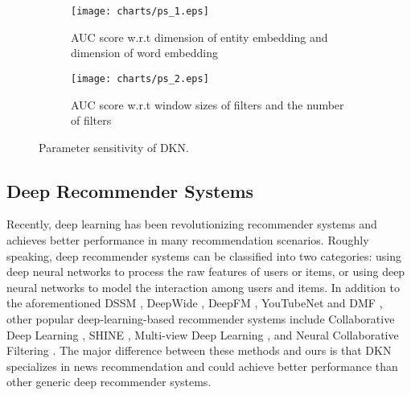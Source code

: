 \documentclass[sigconf]{acmart}
\begin{document}
		\begin{figure}[t]
			\centering
            \begin{subfigure}[b]{0.232\textwidth}
                \texttt{[image: charts/ps\_1.eps]}
                \caption{AUC score w.r.t dimension of entity embedding  and dimension of word embedding }
                \label{fig:ps_a}
            \end{subfigure}
            \hfill
            \begin{subfigure}[b]{0.232\textwidth}
                \texttt{[image: charts/ps\_2.eps]}
                \caption{AUC score w.r.t window sizes of filters and the number of filters }
                \label{fig:ps_b}
            \end{subfigure}
            \caption{Parameter sensitivity of DKN.}
            \label{fig:ps}
            \vspace{-0.05in}
        \end{figure}	
	
	\subsection{Deep Recommender Systems}
		Recently, deep learning has been revolutionizing recommender systems and achieves better performance in many recommendation scenarios.
		Roughly speaking, deep recommender systems can be classified into two categories: using deep neural networks to process the raw features of users or items, or using deep neural networks to model the interaction among users and items.
		In addition to the aforementioned DSSM \cite{huang2013learning}, DeepWide \cite{cheng2016wide}, DeepFM \cite{guo2017deepfm}, YouTubeNet \cite{covington2016deep} and DMF \cite{xue2017deep}, other popular deep-learning-based recommender systems include Collaborative Deep Learning \cite{wang2015collaborative}, SHINE \cite{wang2017shine}, Multi-view Deep Learning \cite{elkahky2015multi}, and Neural Collaborative Filtering \cite{he2017neural}.
		The major difference between these methods and ours is that DKN specializes in news recommendation and could achieve better performance than other generic deep recommender systems.
\end{document}
